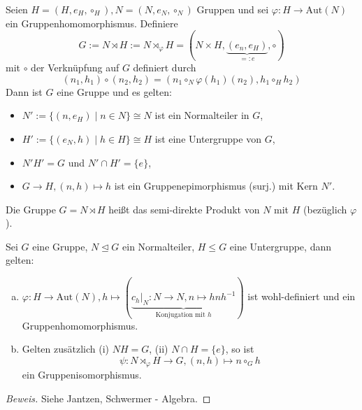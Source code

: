 \documentclass[a4paper]{report}
\begin{document}
\begin{lemm}
  Seien $H=(H, e_{H}, \circ_{H}), N=(N, e_{N}, \circ_{N})$ Gruppen und sei $\varphi : H \to \mathrm{Aut}(N)$ ein Gruppenhomomorphismus. Definiere
  $$G:= N \rtimes H:= N \rtimes_{\varphi} H = (N \times H, \underbrace{(e_{n},e_{H})}_{=:e}, \circ)$$
  mit $\circ$ der Verknüpfung auf $G$ definiert durch
  $$(n_{1},h_{1})\circ (n_{2},h_{2}) = (n_{1} \circ_{N} \varphi(h_{1})(n_{2}), h_{1} \circ_{H} h_{2})$$
  Dann ist $G$ eine Gruppe und es gelten:
  \begin{itemize}
\item $N':= \{(n, e_{H}) \mid n \in N\} \cong N$ ist ein Normalteiler in $G$,
    \item $H':= \{(e_{N}, h) \mid h \in H\} \cong H$ ist eine Untergruppe von $G$,
    \item $N'H' = G$ und $N' \cap H' = \{e\}$,
    \item $G \to H, (n,h) \mapsto h$ ist ein Gruppenepimorphismus (surj.) mit Kern $N'$.
  \end{itemize}
\end{lemm}
\begin{defi}
  Die Gruppe $G = N \rtimes H$ heißt das semi-direkte Produkt von $N$ mit $H$ (bezüglich $\varphi$).
\end{defi}
\begin{satz}
  Sei $G$ eine Gruppe, $N \trianglelefteq G$ ein Normalteiler, $H \le G$ eine Untergruppe, dann gelten:
  \begin{enumerate}[(a)]
    \item $\varphi : H \to \mathrm{Aut}(N), h \mapsto (\underbrace{c_{h}|_{N}: N \to N, n \mapsto hnh^{-1}}_{\text{Konjugation mit }h})$ ist wohl-definiert und ein Gruppenhomomorphismus.
    \item Gelten zusätzlich (i) $NH = G$, (ii) $N \cap H = \{e\}$, so ist
          $$\psi : N \rtimes_{\varphi} H \to G, (n,h) \mapsto n \circ_{G} h$$
          ein Gruppenisomorphismus.
  \end{enumerate}
  \begin{proof}[Beweis]
    Siehe Jantzen, Schwermer - Algebra. %
  \end{proof}
\end{satz}
\end{document}
